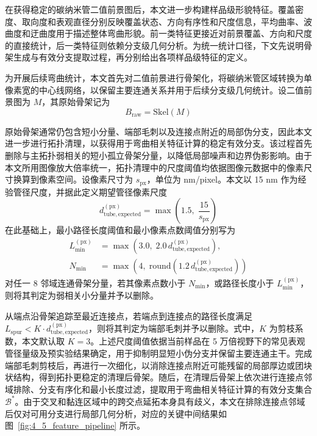 在获得稳定的碳纳米管二值前景图后，本文进一步构建样品级形貌特征。覆盖密度、取向度和表观直径分别反映覆盖状态、方向有序性和尺度信息，平均曲率、波曲度和迂曲度用于描述整体弯曲形貌。前一类特征更接近对前景覆盖、方向和尺度的直接统计，后一类特征则依赖分支级几何分析。为统一统计口径，下文先说明骨架生成与有效分支提取过程，再分别给出各项样品级特征的定义。

为开展后续弯曲统计，本文首先对二值前景进行骨架化，将碳纳米管区域转换为单像素宽的中心线网络，以保留主要连通关系并用于后续分支级几何统计\cite{VanDerWalt2014ScikitImage}。设二值前景图为 $M$，其原始骨架记为
\begin{equation}
    B_{\mathrm{raw}}=\mathrm{Skel}(M)
\end{equation}

原始骨架通常仍包含短小分量、端部毛刺以及连接点附近的局部伪分支，因此本文进一步进行拓扑清理，以获得用于弯曲相关特征计算的稳定有效分支。该过程首先删除与主拓扑弱相关的短小孤立骨架分量，以降低局部噪声和边界伪影影响。由于本文所用图像放大倍率统一，拓扑清理中的尺度阈值均依据图像元数据中的像素尺寸换算到像素空间。设像素尺寸为 $s_{\mathrm{px}}$，单位为 \si{nm/pixel}。本文以 15 nm 作为经验管径尺度，并据此定义期望管径像素尺度
\begin{equation}
    d_{\mathrm{tube,expected}}^{(\mathrm{px})}=
    \max\!\left(1.5,\;\frac{15}{s_{\mathrm{px}}}\right)
\end{equation}
在此基础上，最小路径长度阈值和最小像素点数阈值分别写为
\begin{equation}
    \begin{aligned}
        L_{\min}^{(\mathrm{px})}
        &= \max\!\left(3.0,\;2.0\,d_{\mathrm{tube,expected}}^{(\mathrm{px})}\right),\\
        N_{\min}
        &= \max\!\left(4,\;\mathrm{round}\!\left(1.2\,d_{\mathrm{tube,expected}}^{(\mathrm{px})}\right)\right)
    \end{aligned}
\end{equation}
对任一 8 邻域连通骨架分量，若其像素点数小于 $N_{\min}$，或路径长度小于 $L_{\min}^{(\mathrm{px})}$，则将其判定为弱相关小分量并予以删除。

从端点沿骨架追踪至最近连接点，若端点到连接点的路径长度满足 $L_{\mathrm{spur}}<K\cdot d_{\mathrm{tube,expected}}^{(\mathrm{px})}$，则将其判定为端部毛刺并予以删除。式中，$K$ 为剪枝系数，本文默认取 $K=3$。上述尺度阈值依据当前样品在 5 万倍视野下的常见表观管径量级及预实验结果确定，用于抑制明显短小伪分支并保留主要连通主干。完成端部毛刺剪枝后，再进行一次细化，以消除连接点附近可能残留的局部厚边或团块状结构，得到拓扑更稳定的清理后骨架。随后，在清理后骨架上依次进行连接点邻域排除、分支有序化和最小长度过滤，提取用于弯曲相关特征计算的有效分支集合 $\mathcal{B}^{*}$\cite{NunezIglesias2018Skan}。由于交叉和黏连区域中的跨交点延拓本身具有歧义，本文在排除连接点邻域后仅对可用分支进行局部几何分析\cite{Verho2025FiberSeparation,SosaRey2022OpenFiberSeg}，对应的关键中间结果如图~\ref{fig:4_5_feature_pipeline} 所示。


